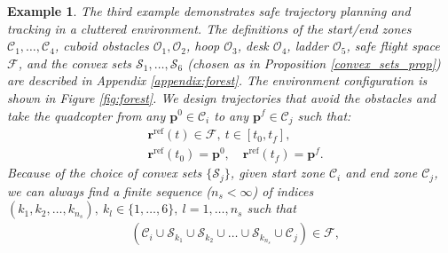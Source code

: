 \documentclass[journal,10pt]{IEEEtran}
\newtheorem{example}{\bfseries Example}%
\newtheorem{problem}{\bfseries Problem}
\newcommand{\vect}[1]{\boldsymbol{\mathbf{#1}}}
\newif\ifdraft
\newcommand{\XX}[1]{\ifdraft{\color{red}[{\bf XX}: #1]}\fi}
\newcommand{\VF}[1]{\ifdraft{\color{blue}[{\bf VF}: #1]}\fi}
\begin{document}
\begin{example} \label{example:forest}
The third example demonstrates safe trajectory planning and tracking in a cluttered environment. The definitions of the start/end zones $\mathcal{C}_1,\ldots,\mathcal{C}_4$, cuboid obstacles $\mathcal{O}_1,\mathcal{O}_2$, \emph{hoop} $\mathcal{O}_{3}$, \emph{desk} $\mathcal{O}_{4}$, \emph{ladder} $\mathcal{O}_{5}$, safe flight space $\mathcal{F}$, and the convex sets  $\mathcal{S}_1,\ldots,\mathcal{S}_6$ (chosen as in Proposition \ref{convex_sets_prop}) are described in Appendix \ref{appendix:forest}. The environment configuration is shown in  Figure \ref{fig:forest}.  We design trajectories that avoid the obstacles and take the quadcopter from any $\vect{p}^0\in\mathcal{C}_i$ to any  $\vect{p}^f\in\mathcal{C}_j$ such that:
\begin{align*} %
    & \vect{r}^{\text{ref}}(t) \in\mathcal{F},\  t\in[t_0,t_f],\\ & \vect{r}^{\text{ref}}(t_0) = \vect{p}^0 , \quad \vect{r}^{\text{ref}}(t_f) = \vect{p}^f. 
\end{align*}
Because of the choice of convex sets $\{\mathcal{S}_j\}$, given start zone $\mathcal{C}_i$  and end zone $\mathcal{C}_j$, we can always find a finite sequence ($n_{s}<\infty$) of indices $(k_1,k_2,\ldots,k_{n_s}), \ k_l\in\{1,\ldots,6\}, \ l=1,\ldots,n_s$ such that
\begin{align*}
    &(\mathcal{C}_i \cup \mathcal{S}_{k_1} \cup \mathcal{S}_{k_2} \cup \ldots \cup \mathcal{S}_{k_{n_s}} \cup \mathcal{C}_j)\in\mathcal{F},\\

\end{align*}
\end{example}
\end{document}
